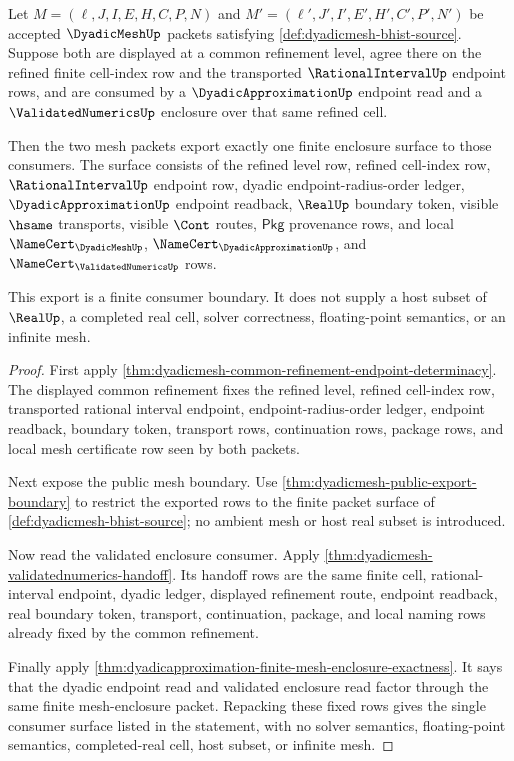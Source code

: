 \begin{theorem}
\label{thm:dyadicmesh-refinement-enclosure-export}
Let
$M=(\ell,J,I,E,H,C,P,N)$ and
$M'=(\ell',J',I',E',H',C',P',N')$ be accepted $\DyadicMeshUp$
packets satisfying \autoref{def:dyadicmesh-bhist-source}. Suppose both are
displayed at a common refinement level, agree there on the refined finite
cell-index row and the transported $\RationalIntervalUp$ endpoint rows, and
are consumed by a $\DyadicApproximationUp$ endpoint read and a
$\ValidatedNumericsUp$ enclosure over that same refined cell.

Then the two mesh packets export exactly one finite enclosure surface to those
consumers. The surface consists of the refined level row, refined cell-index
row, $\RationalIntervalUp$ endpoint row, dyadic endpoint-radius-order ledger,
$\DyadicApproximationUp$ endpoint readback, $\RealUp$ boundary token, visible
$\hsame$ transports, visible $\Cont$ routes, $\mathsf{Pkg}$ provenance rows,
and local $\NameCert_{\DyadicMeshUp}$, $\NameCert_{\DyadicApproximationUp}$,
and $\NameCert_{\ValidatedNumericsUp}$ rows.

This export is a finite consumer boundary. It does not supply a host subset of
$\RealUp$, a completed real cell, solver correctness, floating-point
semantics, or an infinite mesh.
\end{theorem}
\begin{proof}
First apply
\autoref{thm:dyadicmesh-common-refinement-endpoint-determinacy}. The displayed
common refinement fixes the refined level, refined cell-index row, transported
rational interval endpoint, endpoint-radius-order ledger, endpoint readback,
boundary token, transport rows, continuation rows, package rows, and local
mesh certificate row seen by both packets.

Next expose the public mesh boundary. Use
\autoref{thm:dyadicmesh-public-export-boundary} to restrict the exported rows
to the finite packet surface of \autoref{def:dyadicmesh-bhist-source}; no
ambient mesh or host real subset is introduced.

Now read the validated enclosure consumer. Apply
\autoref{thm:dyadicmesh-validatednumerics-handoff}. Its handoff rows are the
same finite cell, rational-interval endpoint, dyadic ledger, displayed
refinement route, endpoint readback, real boundary token, transport,
continuation, package, and local naming rows already fixed by the common
refinement.

Finally apply
\autoref{thm:dyadicapproximation-finite-mesh-enclosure-exactness}. It says
that the dyadic endpoint read and validated enclosure read factor through the
same finite mesh-enclosure packet. Repacking these fixed rows gives the
single consumer surface listed in the statement, with no solver semantics,
floating-point semantics, completed-real cell, host subset, or infinite mesh.
\end{proof}

